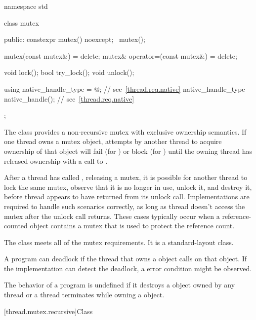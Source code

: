 %
\begin{codeblock}
namespace std {
  class mutex {
  public:
    constexpr mutex() noexcept;
    ~mutex();

    mutex(const mutex&) = delete;
    mutex& operator=(const mutex&) = delete;

    void lock();
    bool try_lock();
    void unlock();

    using native_handle_type = @\impdefnc@;          // see~\ref{thread.req.native}
    native_handle_type native_handle();                         // see~\ref{thread.req.native}
  };
}
\end{codeblock}

\pnum
{}%
The class  provides a non-recursive mutex with exclusive ownership
semantics. If one thread owns a mutex object, attempts by another thread to acquire
ownership of that object will fail (for ) or block (for
) until the owning thread has released ownership with a call to
.

\pnum
\begin{note}
After a thread  has called , releasing a mutex, it is possible for another
thread  to lock the same mutex, observe that it is no longer in use, unlock it, and
destroy it, before thread  appears to have returned from its unlock call. Implementations
are required to handle such scenarios correctly, as long as thread  doesn't access the
mutex after the unlock call returns. These cases typically occur when a reference-counted object
contains a mutex that is used to protect the reference count.
\end{note}

\pnum
The class  meets
all of the mutex requirements.
It is a standard-layout class.

\pnum
\begin{note}
A program can deadlock if the thread that owns a  object calls
 on that object. If the implementation can detect the deadlock,
a  error condition might be observed.
\end{note}

\pnum
The behavior of a program is undefined if
it destroys a  object owned by any thread or
a thread terminates while owning a  object.

[thread.mutex.recursive]{Class }

